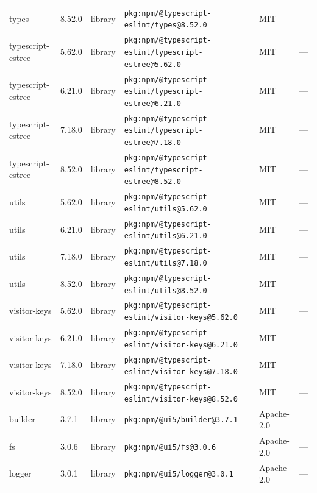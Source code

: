 \documentclass[11pt,a4paper]{article}
\begin{document}
\begin{longtable}{|p{4cm}|p{2cm}|p{1.6cm}|p{5cm}|p{1.5cm}|p{3.5cm}|}
\raggedright types & 8.52.0 & library & \small\texttt{pkg:npm/@typescript-eslint/types@8.52.0} & MIT & \small — \\
\raggedright typescript-estree & 5.62.0 & library & \small\texttt{pkg:npm/@typescript-eslint/typescript-estree@5.62.0} & MIT & \small — \\
\raggedright typescript-estree & 6.21.0 & library & \small\texttt{pkg:npm/@typescript-eslint/typescript-estree@6.21.0} & MIT & \small — \\
\raggedright typescript-estree & 7.18.0 & library & \small\texttt{pkg:npm/@typescript-eslint/typescript-estree@7.18.0} & MIT & \small — \\
\raggedright typescript-estree & 8.52.0 & library & \small\texttt{pkg:npm/@typescript-eslint/typescript-estree@8.52.0} & MIT & \small — \\
\raggedright utils & 5.62.0 & library & \small\texttt{pkg:npm/@typescript-eslint/utils@5.62.0} & MIT & \small — \\
\raggedright utils & 6.21.0 & library & \small\texttt{pkg:npm/@typescript-eslint/utils@6.21.0} & MIT & \small — \\
\raggedright utils & 7.18.0 & library & \small\texttt{pkg:npm/@typescript-eslint/utils@7.18.0} & MIT & \small — \\
\raggedright utils & 8.52.0 & library & \small\texttt{pkg:npm/@typescript-eslint/utils@8.52.0} & MIT & \small — \\
\raggedright visitor-keys & 5.62.0 & library & \small\texttt{pkg:npm/@typescript-eslint/visitor-keys@5.62.0} & MIT & \small — \\
\raggedright visitor-keys & 6.21.0 & library & \small\texttt{pkg:npm/@typescript-eslint/visitor-keys@6.21.0} & MIT & \small — \\
\raggedright visitor-keys & 7.18.0 & library & \small\texttt{pkg:npm/@typescript-eslint/visitor-keys@7.18.0} & MIT & \small — \\
\raggedright visitor-keys & 8.52.0 & library & \small\texttt{pkg:npm/@typescript-eslint/visitor-keys@8.52.0} & MIT & \small — \\
\raggedright builder & 3.7.1 & library & \small\texttt{pkg:npm/@ui5/builder@3.7.1} & Apache-2.0 & \small — \\
\raggedright fs & 3.0.6 & library & \small\texttt{pkg:npm/@ui5/fs@3.0.6} & Apache-2.0 & \small — \\
\raggedright logger & 3.0.1 & library & \small\texttt{pkg:npm/@ui5/logger@3.0.1} & Apache-2.0 & \small — \\

\end{longtable}
\end{document}
